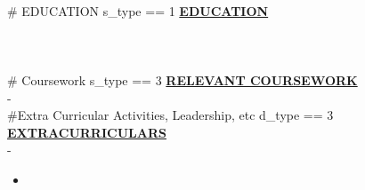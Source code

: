 \documentclass{article}
\begin{document}
        ~\\
\#{ EDUCATION s_type == 1 }
\noindent \textbf{\underline{EDUCATION}} \\
\textbf{} \\
 \hfill {} \\
\textit{}\\
\#{ Coursework s_type == 3 }
\noindent \textbf{\underline{RELEVANT COURSEWORK}}\\
\textbf{} - \\
\#{Extra Curricular Activities, Leadership, etc d_type == 3}
\noindent \textbf{\underline{EXTRACURRICULARS}} \\
\noindent \textbf{} \hfill {} -  %
\begin{itemize}[noitemsep,nolistsep,leftmargin=*]
    \item \textbf{} 
\end{itemize}
        ~\\
\end{document}
